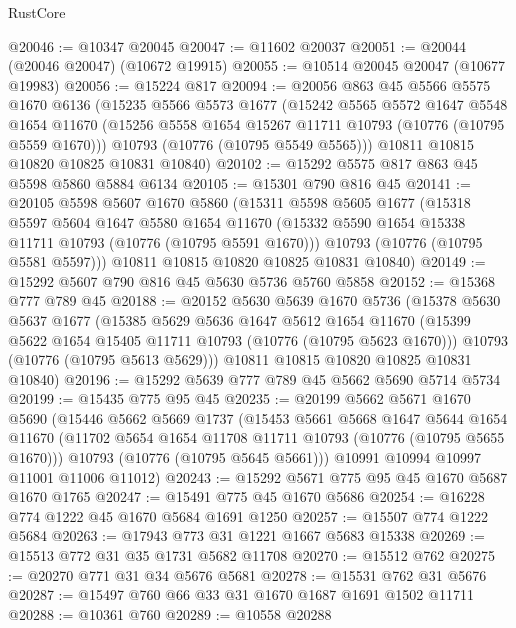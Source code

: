 \begin{lexlean}{RustCore}
\begin{coremodule}
@20046 := @10347 @20045
@20047 := @11602 @20037
@20051 := @20044 (@20046 @20047) (@10672 @19915)
@20055 := @10514 @20045 @20047 (@10677 @19983)
@20056 := @15224 @817
@20094 := @20056
    @863
    @45
    @5566
    @5575
    @1670
    @6136
    (@15235
      @5566
      @5573
      @1677
      (@15242
        @5565
        @5572
        @1647
        @5548
        @1654
        @11670
        (@15256 @5558 @1654 @15267 @11711 @10793 (@10776 (@10795 @5559 @1670)))
        @10793
        (@10776 (@10795 @5549 @5565)))
      @10811
      @10815
      @10820
      @10825
      @10831
      @10840)
@20102 := @15292 @5575 @817 @863 @45 @5598 @5860 @5884 @6134
@20105 := @15301 @790 @816 @45
@20141 := @20105
    @5598
    @5607
    @1670
    @5860
    (@15311
      @5598
      @5605
      @1677
      (@15318
        @5597
        @5604
        @1647
        @5580
        @1654
        @11670
        (@15332 @5590 @1654 @15338 @11711 @10793 (@10776 (@10795 @5591 @1670)))
        @10793
        (@10776 (@10795 @5581 @5597)))
      @10811
      @10815
      @10820
      @10825
      @10831
      @10840)
@20149 := @15292 @5607 @790 @816 @45 @5630 @5736 @5760 @5858
@20152 := @15368 @777 @789 @45
@20188 := @20152
    @5630
    @5639
    @1670
    @5736
    (@15378
      @5630
      @5637
      @1677
      (@15385
        @5629
        @5636
        @1647
        @5612
        @1654
        @11670
        (@15399 @5622 @1654 @15405 @11711 @10793 (@10776 (@10795 @5623 @1670)))
        @10793
        (@10776 (@10795 @5613 @5629)))
      @10811
      @10815
      @10820
      @10825
      @10831
      @10840)
@20196 := @15292 @5639 @777 @789 @45 @5662 @5690 @5714 @5734
@20199 := @15435 @775 @95 @45
@20235 := @20199
    @5662
    @5671
    @1670
    @5690
    (@15446
      @5662
      @5669
      @1737
      (@15453
        @5661
        @5668
        @1647
        @5644
        @1654
        @11670
        (@11702 @5654 @1654 @11708 @11711 @10793 (@10776 (@10795 @5655 @1670)))
        @10793
        (@10776 (@10795 @5645 @5661)))
      @10991
      @10994
      @10997
      @11001
      @11006
      @11012)
@20243 := @15292 @5671 @775 @95 @45 @1670 @5687 @1670 @1765
@20247 := @15491 @775 @45 @1670 @5686
@20254 := @16228 @774 @1222 @45 @1670 @5684 @1691 @1250
@20257 := @15507 @774 @1222 @5684
@20263 := @17943 @773 @31 @1221 @1667 @5683 @15338
@20269 := @15513 @772 @31 @35 @1731 @5682 @11708
@20270 := @15512 @762
@20275 := @20270 @771 @31 @34 @5676 @5681
@20278 := @15531 @762 @31 @5676
@20287 := @15497 @760 @66 @33 @31 @1670 @1687 @1691 @1502 @11711
@20288 := @10361 @760
@20289 := @10558 @20288

\end{coremodule}
\end{lexlean}
